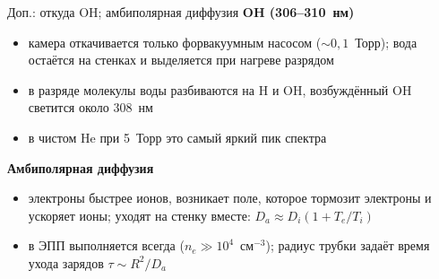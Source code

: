 \documentclass[aspectratio=169,10pt]{beamer}
\begin{document}
\begin{frame}{Доп.: откуда OH; амбиполярная диффузия}
  \textbf{OH (306--310~нм)}
  \begin{itemize}
    \item камера откачивается только форвакуумным насосом ($\sim 0{,}1$~Торр);
          вода остаётся на стенках и выделяется при нагреве разрядом
    \item в разряде молекулы воды разбиваются на H и OH, возбуждённый OH
          светится около 308~нм
    \item в чистом He при 5~Торр это самый яркий пик спектра
  \end{itemize}
  \medskip
  \textbf{Амбиполярная диффузия}
  \begin{itemize}
    \item электроны быстрее ионов, возникает поле, которое тормозит
          электроны и ускоряет ионы; уходят на стенку вместе:
          $D_a \approx D_i(1 + T_e/T_i)$
    \item в ЭПП выполняется всегда ($n_e \gg 10^4$~см$^{-3}$); радиус трубки
          задаёт время ухода зарядов $\tau \sim R^2/D_a$
  \end{itemize}
\end{frame}
\end{document}
